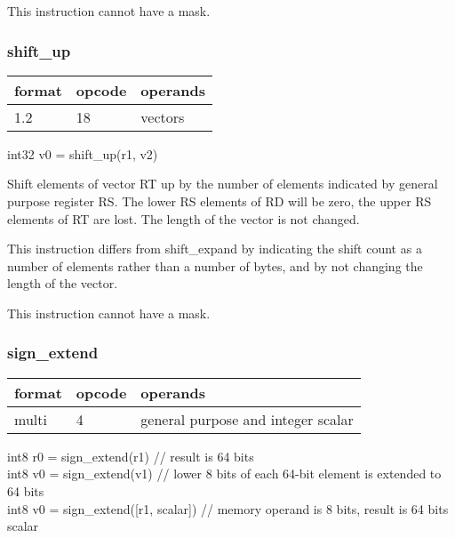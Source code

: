\documentclass[forwardcom.tex]{subfiles}
\begin{document}
\vspace{2mm}
This instruction cannot have a mask.

\subsubsection{shift\_up}
\label{table:shiftUpInstruction}
\begin{tabular}{|p{12mm}|p{12mm}|p{110mm}|}
\hline
\bfseries format & \bfseries opcode & \bfseries operands \\ \hline
1.2 & 18 & vectors \\ \hline
\end{tabular}
\vspace{2mm}

int32 v0 = shift\_up(r1, v2)
\vspace{2mm}

Shift elements of vector RT up by the number of elements indicated by general purpose register RS. 
The lower RS elements of RD will be zero, the upper RS elements of RT are lost. The length of the vector is not changed.
\vspace{2mm}

This instruction differs from shift\_expand by indicating the shift count as a number of elements rather than a number of bytes, and by not changing the length of the vector.
\vspace{2mm}

This instruction cannot have a mask.


\subsubsection{sign\_extend}
\label{table:signExtendInstruction}
\begin{tabular}{|p{12mm}|p{12mm}|p{110mm}|}
\hline
\bfseries format & \bfseries opcode & \bfseries operands \\ \hline
multi & 4 & general purpose and integer scalar \\ \hline
\end{tabular}
\vspace{2mm}

int8 r0 = sign\_extend(r1)  // result is 64 bits\\
int8 v0 = sign\_extend(v1)  // lower 8 bits of each 64-bit element is extended to 64 bits\\
int8 v0 = sign\_extend([r1, scalar]) // memory operand is 8 bits, result is 64 bits scalar
\vspace{2mm}
\end{document}
